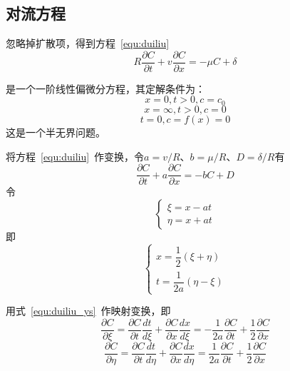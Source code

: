 \documentclass[a4paper,cs4size,adobefonts,fancyhdr]{ctexart}[2005/11/25]
\numberwithin{equation}{section} %
\begin{document}
\subsection{对流方程}
忽略掉扩散项，得到方程~\ref{equ:duiliu}
\begin{equation}\label{equ:duiliu}
R\dfrac{\partial C}{\partial t}+v\dfrac{\partial C}{\partial x}= -\mu C + \delta
\end{equation}\par
是一个一阶线性偏微分方程，其定解条件为：
\begin{equation}\label{equ:duiliu_bj}
x=0,t>0,c=c_0
\end{equation}
\begin{equation}
x=\infty,t>0,c=0
\end{equation}
\begin{equation}\label{equ:duiliu_init}
t=0,c=f(x)=0
\end{equation}
这是一个半无界问题。\par
将方程~\ref{equ:duiliu}~作变换，令$a=v/R$、$b=\mu/R$、$D=\delta/R$有
\begin{equation}\label{equ:duiliu_n}
\dfrac{\partial C}{\partial t}+a\dfrac{\partial C}{\partial x}= -b C + D
\end{equation}
令
\begin{equation}\label{equ:duiliu_ys}
\begin{cases}
\xi=x-at \\
\eta=x+at
\end{cases}
\end{equation}
即
\begin{equation}
\begin{cases}
x=\dfrac{1}{2}(\xi+\eta)\\[1.2em]
t=\dfrac{1}{2a}(\eta-\xi)
\end{cases}
\end{equation}\par
用式~\ref{equ:duiliu_ys}~作映射变换，即
\begin{equation}
\dfrac{\partial C}{\partial \xi}=\dfrac{\partial C}{\partial t}\dfrac{dt}{d\xi}+
								 \dfrac{\partial C}{\partial x}\dfrac{dx}{d\xi}
								=-\dfrac{1}{2a}\dfrac{\partial C}{\partial t}+\dfrac{1}{2}\dfrac{\partial C}{\partial x}						
\end{equation}
\begin{equation}
\dfrac{\partial C}{\partial \eta}=\dfrac{\partial C}{\partial t}\dfrac{dt}{d\eta}+
								 \dfrac{\partial C}{\partial x}\dfrac{dx}{d\eta}
								=\dfrac{1}{2a}\dfrac{\partial C}{\partial t}+
								\dfrac{1}{2}\dfrac{\partial C}{\partial x}		
\end{equation}\par
\end{document}
